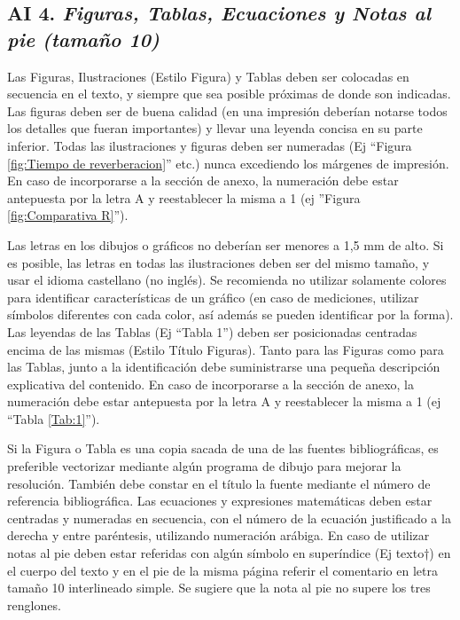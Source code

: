 \subsection*{AI 4. \textit{Figuras, Tablas, Ecuaciones y Notas al pie (tamaño 10)}}

Las Figuras, Ilustraciones (Estilo Figura) y Tablas deben ser colocadas en secuencia en el texto, y siempre que sea posible próximas de donde son indicadas. Las figuras deben ser de buena calidad (en una impresión deberían notarse todos los detalles que fueran importantes) y llevar una leyenda concisa en su parte inferior. Todas las ilustraciones y figuras deben ser numeradas (Ej “Figura \ref{fig:Tiempo de reverberacion}” etc.) nunca excediendo los márgenes de impresión. En caso de incorporarse a la sección de anexo, la numeración debe estar antepuesta por la letra A y reestablecer la misma a 1 (ej ''Figura \ref{fig:Comparativa R}”).

Las letras en los dibujos o gráficos no deberían ser menores a 1,5 mm de alto. Si es posible, las letras en todas las ilustraciones deben ser del mismo tamaño, y usar el idioma castellano (no inglés). Se recomienda no utilizar solamente colores para identificar características de un gráfico (en caso de mediciones, utilizar símbolos diferentes con cada color, así además se pueden identificar por la forma). Las leyendas de las Tablas (Ej “Tabla 1”) deben ser posicionadas centradas encima de las mismas (Estilo Título Figuras). Tanto para las Figuras como para las Tablas, junto a la identificación debe suministrarse una pequeña descripción explicativa del contenido. En caso de incorporarse a la sección de anexo, la numeración debe estar antepuesta por la letra A y reestablecer la misma a 1 (ej “Tabla \ref{Tab:1}”).

Si la Figura o Tabla es una copia sacada de una de las fuentes bibliográficas, es preferible vectorizar mediante algún programa de dibujo para mejorar la resolución. También debe constar en el título la fuente mediante el número de referencia bibliográfica.
Las ecuaciones y expresiones matemáticas deben estar centradas y numeradas en secuencia, con el número de la ecuación justificado a la derecha y entre paréntesis, utilizando numeración arábiga.
En caso de utilizar notas al pie deben estar referidas con algún símbolo en superíndice (Ej texto†) en el cuerpo del texto y en el pie de la misma página referir el comentario en letra tamaño 10 interlineado simple. Se sugiere que la nota al pie no supere los tres renglones.

